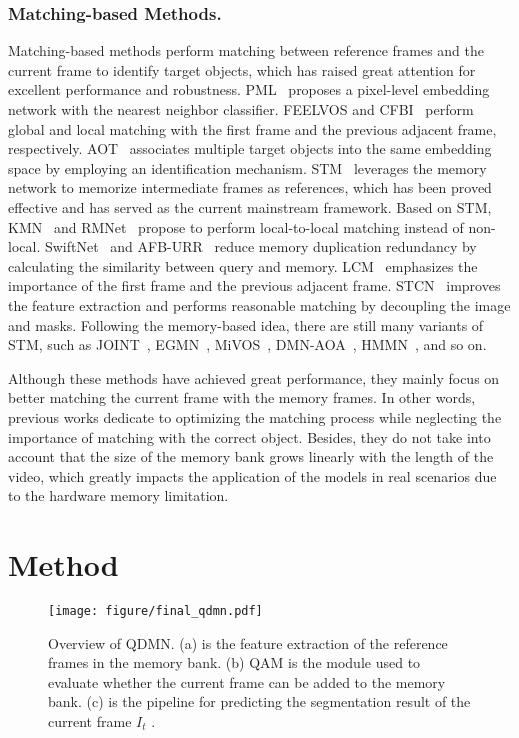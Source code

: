 \documentclass[runningheads]{llncs}
\begin{document}
    \subsubsection{Matching-based Methods.} 
    Matching-based methods perform matching between reference frames and the current frame to identify target objects, which has raised great attention for excellent performance and robustness.
    PML~\cite{pml} proposes a pixel-level embedding network with the nearest neighbor classifier.
FEELVOS \cite{feelvos} and CFBI~\cite{cfbi} perform global and local matching with the first frame and the previous adjacent frame, respectively.
AOT~\cite{aot} associates multiple target objects into the same embedding space by employing an identification mechanism.
    STM~\cite{stm} leverages the memory network to memorize intermediate frames as references, which has been proved effective and has served as the current mainstream framework. 
    Based on STM, KMN~\cite{kmn} and RMNet~\cite{rmnet} propose to perform local-to-local matching instead of non-local.
    SwiftNet~\cite{swiftnet} and AFB-URR~\cite{afb-urr} reduce memory duplication redundancy by calculating the similarity between query and memory.
    LCM~\cite{lcm} emphasizes the importance of the first frame and the previous adjacent frame.
    STCN~\cite{stcn} improves the feature extraction and performs reasonable matching by decoupling the image and masks.
Following the memory-based idea, there are still many variants of STM, such as JOINT~\cite{joint}, EGMN~\cite{egmn}, MiVOS~\cite{mivos}, DMN-AOA~\cite{alignment}, HMMN~\cite{hmm}, and so on.
    
    Although these methods have achieved great performance, they mainly focus on better matching the current frame with the memory frames.
    In other words, previous works dedicate to optimizing the matching process while neglecting the importance of matching with the correct object.
    Besides, they do not take into account that the size of the memory bank grows linearly with the length of the video, which greatly impacts the application of the models in real scenarios due to the hardware memory limitation.
 \section{Method}

\begin{figure*}[t]
    \centering
    \texttt{[image: figure/final\_qdmn.pdf]}
    \caption{Overview of QDMN. (a) is the feature extraction of the reference frames in the memory bank. (b) QAM is the module used to evaluate whether the current frame can be added to the memory bank. (c)
    is the pipeline for predicting the segmentation result of the current frame ${I}_t$ .
    }
    \label{framework}
\end{figure*}
\end{document}
